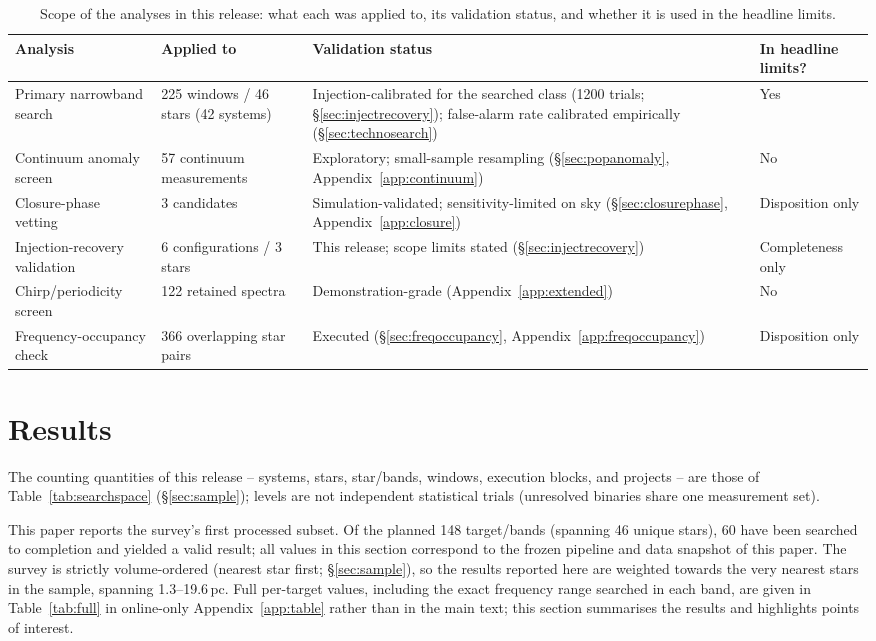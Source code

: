 \documentclass{openjournal}
\begin{document}
\begin{table}
\centering
\small
\caption{Scope of the analyses in this release: what each was applied
to, its validation status, and whether it is used in the headline
limits.}
\label{tab:supp}
\begin{tabular}{@{}p{}p{}p{}p{}@{}}
\toprule
Analysis & Applied to & Validation status & In headline limits? \\
\midrule
Primary narrowband search & 225 windows / 46 stars (42 systems) &
Injection-calibrated for the searched class (1200 trials;
\S\ref{sec:injectrecovery}); false-alarm rate calibrated empirically
(\S\ref{sec:technosearch}) & Yes \\
Continuum anomaly screen & 57 continuum measurements &
Exploratory; small-sample resampling (\S\ref{sec:popanomaly},
Appendix~\ref{app:continuum}) & No \\
Closure-phase vetting & 3 candidates & Simulation-validated;
sensitivity-limited on sky (\S\ref{sec:closurephase},
Appendix~\ref{app:closure}) & Disposition only \\
Injection-recovery validation & 6 configurations / 3 stars &
This release; scope limits stated (\S\ref{sec:injectrecovery}) &
Completeness only \\
Chirp/periodicity screen & 122 retained spectra & Demonstration-grade
(Appendix~\ref{app:extended}) & No \\
Frequency-occupancy check & 366 overlapping star pairs & Executed
(\S\ref{sec:freqoccupancy}, Appendix~\ref{app:freqoccupancy}) &
Disposition only \\
\bottomrule
\end{tabular}
\end{table}

\section{Results}
\label{sec:results}

The counting quantities of this release -- systems, stars,
star/bands, windows, execution blocks, and projects -- are those of
Table~\ref{tab:searchspace} (\S\ref{sec:sample}); levels are not
independent statistical trials (unresolved binaries share one
measurement set).

This paper reports the survey's first processed subset. Of the planned
148 target/bands (spanning 46 unique stars), 60 have been searched to
completion and yielded a valid result; all values in this section
correspond to the frozen pipeline and data snapshot of this paper. The survey is strictly volume-ordered (nearest star first;
\S\ref{sec:sample}), so the results reported here are weighted towards
the very nearest stars in the sample, spanning 1.3--19.6\,pc. Full
per-target values, including the exact frequency range searched in each
band, are given in Table~\ref{tab:full} in online-only Appendix~\ref{app:table}
rather than in the main text; this section summarises the results and
highlights points of interest.
\end{document}
